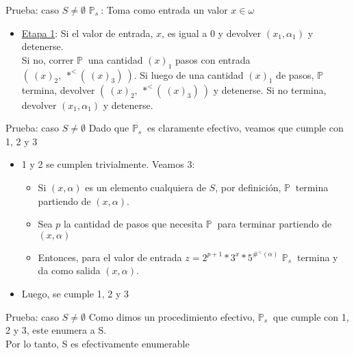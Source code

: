 \documentclass[10pt]{beamer}
\newcommand{\p}{\mathbb{P}}
\begin{document}
\begin{frame}{Prueba: caso $S \neq \emptyset$}
  \underline{$\p_{s}\ $}: Toma como entrada un valor $x \in \omega$
  \begin{itemize}[<+->]
    \item[ ] \underline{Etapa 1}: Si el valor de entrada, $x$, es igual a $0$
    y devolver $(x_{1}, \alpha_{1})$ y detenerse. \\
    Si no, correr $\p\ $ una cantidad $(x)_{1}$ pasos con entrada
    $(\ (x)_{2},\ *^{<}(\ (x)_{3})\ )$. Si luego de una cantidad $(x)_{1}$
    de pasos, $\p\ $ termina, devolver $(\ (x)_{2},\ *^{<}(\ (x)_{3})\ )$ y
    detenerse. Si no termina, devolver $(x_{1}, \alpha_{1})$ y detenerse.

  \end{itemize}
\end{frame}

\begin{frame}{Prueba: caso $S \neq \emptyset$}
  Dado que $\p_{s}\ $ es claramente efectivo, veamos que cumple con 1, 2 y 3
  \begin{itemize}[<+->]
    \item 1 y 2 se cumplen trivialmente. Veamos 3:
    \begin{itemize}[<+->]
      \item Si $(x, \alpha)$ es un elemento cualquiera de $S$, por definición,
      $\p\ $ termina partiendo de $(x, \alpha)$.
      \item Sea $p$ la cantidad de pasos que necesita $\p\ $ para terminar partiendo
      de $(x, \alpha)$
      \item Entonces, para el valor de entrada
      $z = 2^{p+1} * 3^{x} * 5^{\#^{<}(\alpha)}$ $\p_{s}\ $ termina y da como salida
      $(x, \alpha)$.
    \end{itemize}
    \item Luego, se cumple 1, 2 y 3
  \end{itemize}

\end{frame}


\begin{frame}{Prueba: caso $S \neq \emptyset$}
  Como dimos un procedimiento efectivo, $\p_{s}\ $ que cumple con 1, 2 y 3, este
  enumera a S. \\
  Por lo tanto, S es efectivamente enumerable
\end{frame}
\end{document}
